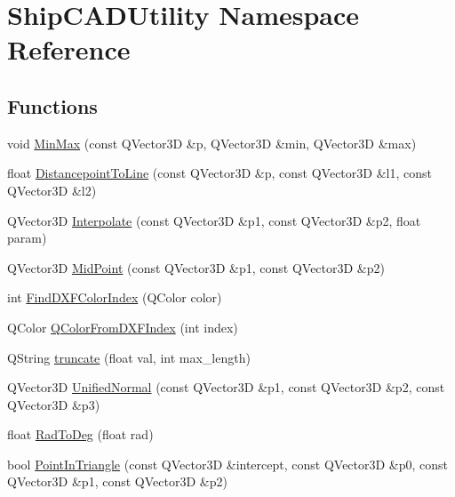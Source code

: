 \hypertarget{namespaceShipCADUtility}{\section{Ship\-C\-A\-D\-Utility Namespace Reference}
\label{namespaceShipCADUtility}
}
\subsection*{Functions}
\begin{DoxyCompactItemize}
\item 
void \hyperlink{namespaceShipCADUtility_a59319d180ddc21b49297d06ea29e9c1c}{Min\-Max} (const Q\-Vector3\-D \&p, Q\-Vector3\-D \&min, Q\-Vector3\-D \&max)
\item 
float \hyperlink{namespaceShipCADUtility_a9cc45330fe03dcb360436d1ea4f9ae06}{Distancepoint\-To\-Line} (const Q\-Vector3\-D \&p, const Q\-Vector3\-D \&l1, const Q\-Vector3\-D \&l2)
\item 
Q\-Vector3\-D \hyperlink{namespaceShipCADUtility_a3414bb124c7ac03c319374dcbbb98696}{Interpolate} (const Q\-Vector3\-D \&p1, const Q\-Vector3\-D \&p2, float param)
\item 
Q\-Vector3\-D \hyperlink{namespaceShipCADUtility_a96e919481d0fc77dee9afa7fbb7cd7f7}{Mid\-Point} (const Q\-Vector3\-D \&p1, const Q\-Vector3\-D \&p2)
\item 
int \hyperlink{namespaceShipCADUtility_ab449c99b07dc90b100ddc3b9851e0548}{Find\-D\-X\-F\-Color\-Index} (Q\-Color color)
\item 
Q\-Color \hyperlink{namespaceShipCADUtility_ac607c4476c9d09a898cf1ef99f153354}{Q\-Color\-From\-D\-X\-F\-Index} (int index)
\item 
Q\-String \hyperlink{namespaceShipCADUtility_a06d7835bd1c8b83fe16499cf6401f800}{truncate} (float val, int max\-\_\-length)
\item 
Q\-Vector3\-D \hyperlink{namespaceShipCADUtility_a6c3600057ec6518536b613bc5b2003ec}{Unified\-Normal} (const Q\-Vector3\-D \&p1, const Q\-Vector3\-D \&p2, const Q\-Vector3\-D \&p3)
\item 
float \hyperlink{namespaceShipCADUtility_a36f59326defec976681e829c81f829ce}{Rad\-To\-Deg} (float rad)
\item 
bool \hyperlink{namespaceShipCADUtility_a3e6a6645c0b5e02a7135564cb8f90b0b}{Point\-In\-Triangle} (const Q\-Vector3\-D \&intercept, const Q\-Vector3\-D \&p0, const Q\-Vector3\-D \&p1, const Q\-Vector3\-D \&p2)
\item 

\end{DoxyCompactItemize}
